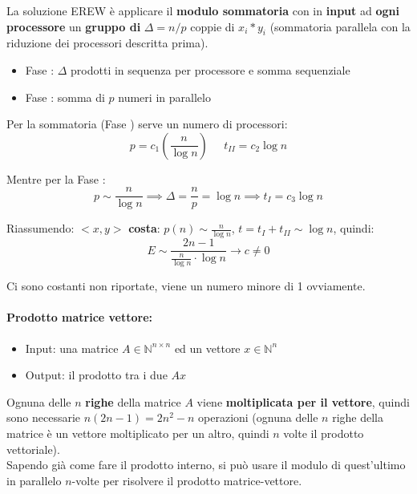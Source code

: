 La soluzione EREW è applicare il \textbf{modulo sommatoria} con in \textbf{input} ad \textbf{ogni processore} un \textbf{gruppo di} $\Delta = n/p$ coppie di $x_i \ast y_i$ (sommatoria parallela con la riduzione dei processori descritta prima).\\

\begin{itemize}
	\item Fase : $\Delta$ prodotti in sequenza per processore e somma sequenziale
	\item Fase : somma di $p$ numeri in parallelo
\end{itemize}

Per la sommatoria (Fase ) serve un numero di processori: 
$$ p = c_1 (\frac{n}{\log n}) \;\;\;\;\; t_{II} = c_2 \log n $$

Mentre per la Fase : 
$$ p \sim \frac{n}{\log n}  \implies \Delta = \frac{n}{p} = \log n \implies t_{I} = c_3 \log n$$

Riassumendo:
$<x,y>$ \textbf{costa}: $p(n) \sim \frac{n}{\log n}$, $t = t_{I} + t_{II} \sim \log n$, quindi:
$$ E \sim \frac{2n-1}{\frac{n}{\log n} \cdot \log n} \rightarrow c \neq 0 $$

Ci sono costanti non riportate, viene un numero minore di 1 ovviamente.\\

\newpage

\paragraph{Prodotto matrice vettore:}
\begin{itemize}
	\item Input: una matrice $A \in \mathbb{N}^{n \times n}$ ed un vettore $x \in \mathbb{N}^n$
	\item Output: il prodotto tra i due $Ax$ 
\end{itemize}

Ognuna delle $n$ \textbf{righe} della matrice $A$ viene \textbf{moltiplicata per il vettore}, quindi sono necessarie $n(2n-1) = 2n^2 -n$ operazioni (ognuna delle $n$ righe della matrice è un vettore moltiplicato per un altro, quindi $n$ volte il prodotto vettoriale).\\

Sapendo già come fare il prodotto interno, si può usare il modulo di quest'ultimo in parallelo $n$-volte per risolvere il prodotto matrice-vettore.\\

